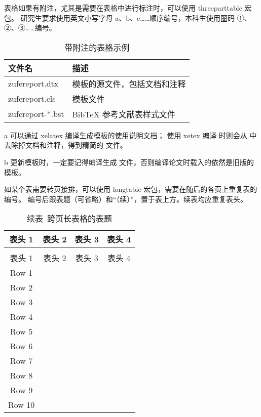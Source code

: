 表格如果有附注，尤其是需要在表格中进行标注时，可以使用 threeparttable 宏包。
研究生要求使用英文小写字母 a、b、c……顺序编号，本科生使用圈码 ①、②、③……编号。

\begin{table}[htbp]
	\centering
	\begin{threeparttable}[c]
		\caption{带附注的表格示例}
		\label{tab:three-part-table}
		\begin{tabular}{ll}
			\toprule
			文件名                 & 描述                         \\
			\midrule
			zufereport.dtx\tnote{a} & 模板的源文件，包括文档和注释 \\
			zufereport.cls\tnote{b} & 模板文件                     \\
			zufereport-*.bst        & BibTeX 参考文献表样式文件    \\
			\bottomrule
		\end{tabular}
		\begin{tablenotes}
			\item [a] 可以通过 xelatex 编译生成模板的使用说明文档；
			使用 xetex 编译  时则会从  中去除掉文档和注释，得到精简的  文件。
			\item [b] 更新模板时，一定要记得编译生成  文件，否则编译论文时载入的依然是旧版的模板。
		\end{tablenotes}
	\end{threeparttable}
\end{table}

如某个表需要转页接排，可以使用 longtable 宏包，需要在随后的各页上重复表的编号。
编号后跟表题（可省略）和“（续）”，置于表上方。续表均应重复表头。

\singlespacing
\begin{longtable}{cccc}
	\caption{跨页长表格的表题}
	\label{tab:longtable} \\
	\toprule
	表头 1 & 表头 2 & 表头 3 & 表头 4 \\
	\midrule
	\endfirsthead
	\caption*{续表~\thetable\quad 跨页长表格的表题} \\
	\toprule
	表头 1 & 表头 2 & 表头 3 & 表头 4 \\
	\midrule
	\endhead
	\bottomrule
	\endfoot
	Row 1  & & & \\
	Row 2  & & & \\
	Row 3  & & & \\
	Row 4  & & & \\
	Row 5  & & & \\
	Row 6  & & & \\
	Row 7  & & & \\
	Row 8  & & & \\
	Row 9  & & & \\
	Row 10 & & & \\
\end{longtable}

